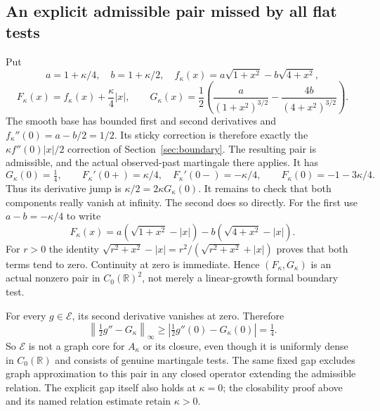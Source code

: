 \documentclass[11pt]{article}
\newcommand{\R}{\mathbb R}
\begin{document}
\subsection*{An explicit admissible pair missed by all flat tests}
Put
\[
 a=1+\kappa/4,\quad b=1+\kappa/2,\quad
 f_\kappa(x)=a\sqrt{1+x^2}-b\sqrt{4+x^2},
\]
\begin{equation}\label{eq:vanishingstickypair}
 F_\kappa(x)=f_\kappa(x)+\frac\kappa4|x|,\qquad
 G_\kappa(x)=\frac12\left(
 \frac{a}{(1+x^2)^{3/2}}-\frac{4b}{(4+x^2)^{3/2}}\right).
\end{equation}
The smooth base has bounded first and second derivatives and
$f_\kappa''(0)=a-b/2=1/2$. Its sticky correction is therefore exactly
the $\kappa f''(0)|x|/2$ correction of Section~\ref{sec:boundary}.
The resulting pair is admissible, and the actual observed-past
martingale there applies. It has
\[
 G_\kappa(0)=\tfrac14,\qquad
 F_\kappa'(0+)=\kappa/4,\quad F_\kappa'(0-)=-\kappa/4,
 \qquad F_\kappa(0)=-1-3\kappa/4.
\]
Thus its derivative jump is $\kappa/2=2\kappa G_\kappa(0)$.
It remains to check that both components really vanish at infinity.
The second does so directly. For the first use $a-b=-\kappa/4$ to write
\[
 F_\kappa(x)=a(\sqrt{1+x^2}-|x|)
                 -b(\sqrt{4+x^2}-|x|).
\]
For $r>0$ the identity
$\sqrt{r^2+x^2}-|x|=r^2/(\sqrt{r^2+x^2}+|x|)$ proves that both terms
tend to zero. Continuity at zero is immediate. Hence
$(F_\kappa,G_\kappa)$ is an actual nonzero pair in $C_0(\R)^2$,
not merely a linear-growth formal boundary test.

For every $g\in\mathcal E$, its second derivative vanishes at zero.
Therefore
\begin{equation}\label{eq:stickygraphgap}
 \left\|\tfrac12g''-G_\kappa\right\|_\infty
 \geq\left|\tfrac12g''(0)-G_\kappa(0)\right|=\tfrac14.
\end{equation}
So $\mathcal E$ is not a graph core for $A_\kappa$ or its closure,
even though it is uniformly dense in $C_0(\R)$ and consists of genuine
martingale tests. The same fixed gap excludes graph approximation to
this pair in any closed operator extending the admissible relation.
The explicit gap itself also holds at $\kappa=0$; the closability proof
above and its named relation estimate retain $\kappa>0$.
\end{document}
